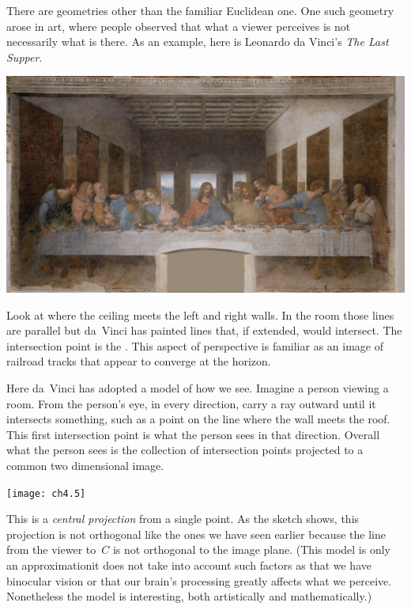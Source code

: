 There are geometries other than the familiar Euclidean one.
One such geometry arose in art, where people observed
that what a viewer perceives is not necessarily what is there.
As an example, here is Leonardo da Vinci's 
\emph{The Last Supper}.
\begin{center} 
  \includegraphics[width=.6\textwidth]{LastSupper.jpg}
\end{center}
Look at where the ceiling meets the left and right walls.
In the room those lines are parallel but 
da~Vinci has painted lines that, if extended, would intersect.
The intersection point is the 
.
This aspect of perspective is familiar as an image of 
railroad tracks that appear to converge at the horizon.

Here da~Vinci has adopted a model of how we see.
Imagine a person viewing a room.
From the person's eye, in every direction,
carry a ray outward until it intersects something, such
as a point on the line where the wall meets the roof.
This first intersection point is what the person sees in that direction.
Overall what the person sees is the collection of intersection points
projected to a common two dimensional image. 
\begin{center}
  \texttt{[image: ch4.5]}
\end{center}
This is a 
\emph{central projection} 
from a single point.
As the sketch shows, this projection is not orthogonal
like the ones we have seen earlier 
because the line
from the viewer to~$C$ is not orthogonal to the image plane.
(This model is only an approximation\Dash it does not take into
account such factors as
that we have binocular vision or that our brain's processing 
greatly affects what we perceive. 
Nonetheless the model is interesting,
both artistically and mathematically.)

